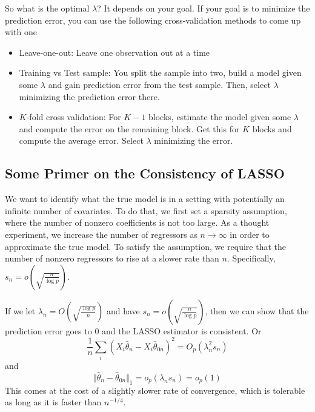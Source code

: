 \documentclass[12pt]{article}
\theoremstyle{definition}
\theoremstyle{property}
\theoremstyle{assumption}
\theoremstyle{example}
\theoremstyle{comment}
\begin{document}
So what is the optimal $\lambda$? It depends on your goal. If your goal is to minimize the prediction error, you can use the following cross-validation methods to come up with one
\begin{itemize}
\item Leave-one-out: Leave one observation out at a time
\item Training vs Test sample: You split the sample into two, build a model given some $\lambda$ and gain prediction error from the test sample. Then, select $\lambda$ minimizing the prediction error there.
\item $K$-fold cross validation:  For $K-1$ blocks, estimate the model given some $\lambda$ and compute the error on the remaining block. Get this for $K$ blocks and compute the average error. Select $\lambda$ minimizing the error. 
\end{itemize}
\subsection{Some Primer on the Consistency of LASSO}
We want to identify what the true model is in a setting with potentially an infinite number of covariates. To do that, we first set a sparsity assumption, where the number of nonzero coefficients is not too large. As a thought experiment, we increase the number of regressors as $n\to\infty$ in order to approximate the true model. To satisfy the assumption, we require that the number of nonzero regressors to rise at a slower rate than $n$. Specifically, $s_n = o\left(\sqrt{\frac{n}{\log p}}\right)$. \par
If we let $\lambda_n = O\left(\sqrt{\frac{\log p}{n}}\right)$ and have $s_n=o\left(\sqrt{\frac{n}{\log p}}\right)$, then we can show that the prediction error goes to 0 and the LASSO estimator is consistent. Or
\[
\frac{1}{n}\sum_i(X_i\hat{\theta}_n-X_i\hat{\theta}_{0n})^2=O_p(\lambda_n^2s_n)
\]
and 
\[
\Vert \hat{\theta}_n-\hat{\theta}_{0n}\Vert_1 = o_p(\lambda_n s_n) = o_p(1)
\]
This comes at the cost of a slightly slower rate of convergence, which is tolerable as long as it is faster than $n^{-1/4}$.
\end{document}
